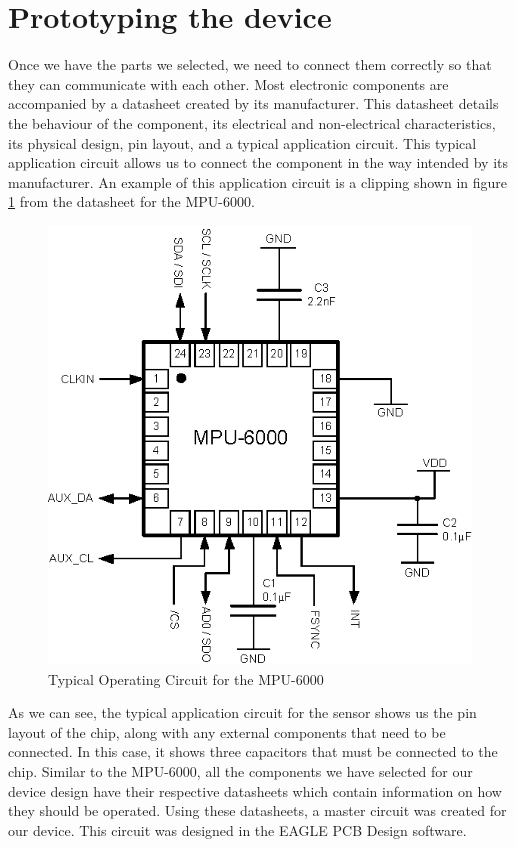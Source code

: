 \section{Prototyping the device}
\label{Chap:Prototype}
Once we have the parts we selected,
we need to connect them correctly so that they can communicate with each other.
Most electronic components are accompanied by a datasheet created by its manufacturer.
This datasheet details the behaviour of the component,
its electrical and non-electrical characteristics,
its physical design,
pin layout,
and a typical application circuit.
This typical application circuit allows us to connect the component in the way intended by its manufacturer.
An example of this application circuit is a clipping shown in figure \ref{Fig:MPUAppCircuit} from the datasheet \cite{Datasheet:MPU6000} for the MPU-6000.
\begin{figure}
\begin{center}
\includegraphics{images/MPU600OpCircuit.eps}
\caption{Typical Operating Circuit for the MPU-6000}
\label{Fig:MPUAppCircuit}
\end{center}
\end{figure}
As we can see,
the typical application circuit for the sensor shows us the pin layout of the chip,
along with any external components that need to be connected.
In this case, it shows three capacitors that must be connected to the chip.
Similar to the MPU-6000,
all the components we have selected for our device design have their respective datasheets which contain information on how they should be operated.
Using these datasheets,
a master circuit was created for our device.
This circuit was designed in the EAGLE PCB Design software.

